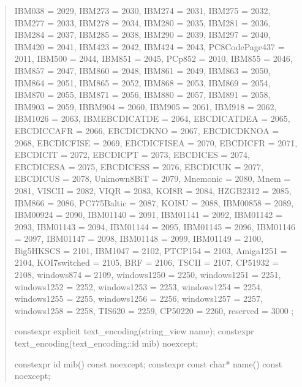 \documentclass{wg21}
\begin{document}
\begin{quote}
\begin{addedblock}
\begin{codeblock}
{{{        IBM038 = 2029,
        IBM273 = 2030,
        IBM274 = 2031,
        IBM275 = 2032,
        IBM277 = 2033,
        IBM278 = 2034,
        IBM280 = 2035,
        IBM281 = 2036,
        IBM284 = 2037,
        IBM285 = 2038,
        IBM290 = 2039,
        IBM297 = 2040,
        IBM420 = 2041,
        IBM423 = 2042,
        IBM424 = 2043,
        PC8CodePage437 = 2011,
        IBM500 = 2044,
        IBM851 = 2045,
        PCp852 = 2010,
        IBM855 = 2046,
        IBM857 = 2047,
        IBM860 = 2048,
        IBM861 = 2049,
        IBM863 = 2050,
        IBM864 = 2051,
        IBM865 = 2052,
        IBM868 = 2053,
        IBM869 = 2054,
        IBM870 = 2055,
        IBM871 = 2056,
        IBM880 = 2057,
        IBM891 = 2058,
        IBM903 = 2059,
        IBBM904 = 2060,
        IBM905 = 2061,
        IBM918 = 2062,
        IBM1026 = 2063,
        IBMEBCDICATDE = 2064,
        EBCDICATDEA = 2065,
        EBCDICCAFR = 2066,
        EBCDICDKNO = 2067,
        EBCDICDKNOA = 2068,
        EBCDICFISE = 2069,
        EBCDICFISEA = 2070,
        EBCDICFR = 2071,
        EBCDICIT = 2072,
        EBCDICPT = 2073,
        EBCDICES = 2074,
        EBCDICESA = 2075,
        EBCDICESS = 2076,
        EBCDICUK = 2077,
        EBCDICUS = 2078,
        Unknown8BiT = 2079,
        Mnemonic = 2080,
        Mnem = 2081,
        VISCII = 2082,
        VIQR = 2083,
        KOI8R = 2084,
        HZGB2312 = 2085,
        IBM866 = 2086,
        PC775Baltic = 2087,
        KOI8U = 2088,
        IBM00858 = 2089,
        IBM00924 = 2090,
        IBM01140 = 2091,
        IBM01141 = 2092,
        IBM01142 = 2093,
        IBM01143 = 2094,
        IBM01144 = 2095,
        IBM01145 = 2096,
        IBM01146 = 2097,
        IBM01147 = 2098,
        IBM01148 = 2099,
        IBM01149 = 2100,
        Big5HKSCS = 2101,
        IBM1047 = 2102,
        PTCP154 = 2103,
        Amiga1251 = 2104,
        KOI7switched = 2105,
        BRF = 2106,
        TSCII = 2107,
        CP51932 = 2108,
        windows874 = 2109,
        windows1250 = 2250,
        windows1251 = 2251,
        windows1252 = 2252,
        windows1253 = 2253,
        windows1254 = 2254,
        windows1255 = 2255,
        windows1256 = 2256,
        windows1257 = 2257,
        windows1258 = 2258,
        TIS620 = 2259,
        CP50220 = 2260,
        reserved = 3000
    };

    constexpr explicit text_encoding(string_view name);
    constexpr text_encoding(text_encoding::id mib) noexcept;

    constexpr id mib() const noexcept;
    constexpr const char* name() const noexcept;

}}
\end{codeblock}
\end{addedblock}
\end{quote}
\end{document}
